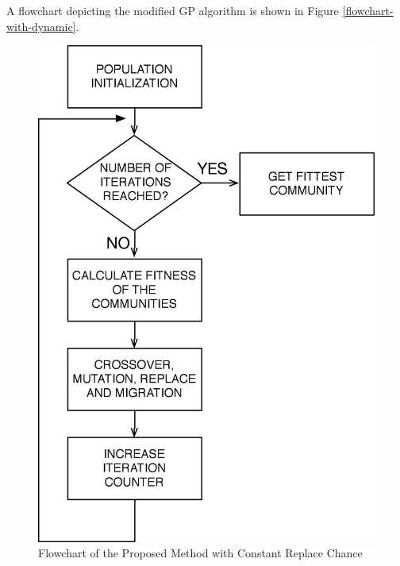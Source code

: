 \documentclass[a4paper,twoside]{article}
\begin{document}
A flowchart depicting the modified GP algorithm is shown in Figure \ref{flowchart-with-dynamic}.

\begin{figure}[h!]
\begin{center}
\includegraphics[width=0.70\columnwidth]{figures/flowchart-without/flowchart-without}
\caption{{\label{flowchart-without-dynamic}Flowchart of the Proposed Method with Constant Replace Chance%
}}
\end{center}
\end{figure}
\end{document}
